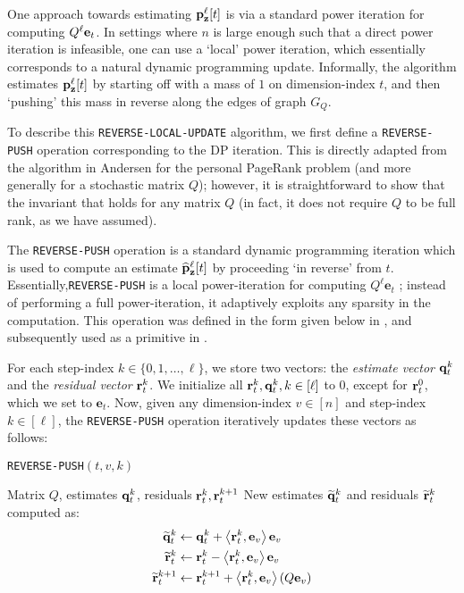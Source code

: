 One approach towards estimating ${\mathbf{p}}_\mathbf{z}^{\ell}[t]$ is via a standard power iteration for computing $Q^{\ell}\mathbf{e}_t$. 
In settings where $n$ is large enough such that a direct power iteration is infeasible, one can use a `local' power iteration, which essentially corresponds to a natural dynamic programming update. Informally, the algorithm estimates ${\mathbf{p}}_\mathbf{z}^{\ell}[t]$ by starting off with a mass of $1$ on dimension-index $t$, and then `pushing' this mass in reverse along the edges of graph $G_Q$. 

To describe this \texttt{REVERSE-LOCAL-UPDATE} algorithm, we first define a \texttt{REVERSE-PUSH} operation corresponding to the DP iteration. 
This is directly adapted from the algorithm in Andersen \cite{andersen2007local} for the personal PageRank problem (and more generally for a stochastic matrix $Q$); however, it is straightforward to show that the invariant that holds for any matrix $Q$ (in fact, it does not require $Q$ to be full rank, as we have assumed).
 
The \texttt{REVERSE-PUSH} operation is a standard dynamic programming iteration which is used to compute an estimate $\widehat{\mathbf{p}}_\mathbf{z}^{\ell}[t]$ by proceeding `in reverse' from $t$. 
Essentially,\texttt{REVERSE-PUSH} is a local power-iteration for computing $Q^{\ell}\mathbf{e}_t$ ; instead of performing a full power-iteration, it adaptively exploits any sparsity in the computation.
This operation was defined in the form given below in \cite{andersen2007local}, and subsequently used as a primitive in \cite{banerjee2015fast, lee2014asynchronous}.


For each step-index $k \in\{0,1,\ldots,\ell \}$, we store two vectors: the \emph{estimate vector} $\mathbf{q}^{k}_t$ and the \emph{residual vector} $\mathbf{r}^{k}_t$.
We initialize all $\mathbf{r}^{k}_t,\mathbf{q}^{k}_t, k\in[\ell]$ to $0$, except for $\mathbf{r}^{0}_t$, which we set to $\mathbf{e}_t$.
Now, given any dimension-index $v\in[n]$ and step-index $k \in[\ell]$, the \texttt{REVERSE-PUSH} operation iteratively updates these vectors as follows:
\begin{algorithm}[!ht]
\caption{\texttt{REVERSE-PUSH}$(t,v,k)$}
\label{alg:push}
\begin{algorithmic}[1]
\REQUIRE Matrix $Q$, estimates $\mathbf{q}^{k}_t$, residuals $\mathbf{r}^{k}_t,\mathbf{r}^{k+1}_t$
\RETURN New estimates $\widetilde{\mathbf{q}}^{k}_t$ and residuals $\widetilde{\mathbf{r}}^{k}_t$ computed as:
\begin{align*}
	\widetilde{\mathbf{q}}^{k}_t &\leftarrow \mathbf{q}^{k}_t + \left< \mathbf{r}^{k}_t, \mathbf{e}_v \right>\mathbf{e}_v \\
	\widetilde{\mathbf{r}}^{k}_t &\leftarrow \mathbf{r}^{k}_t - \left< \mathbf{r}^{k}_t, \mathbf{e}_v \right>\mathbf{e}_v \\
	\widetilde{\mathbf{r}}^{k+1}_t &\leftarrow \mathbf{r}^{k+1}_t + \left< \mathbf{r}^{k}_t, \mathbf{e}_v \right>(Q\mathbf{e}_v)
\end{align*}	
\end{algorithmic}
\end{algorithm}    

